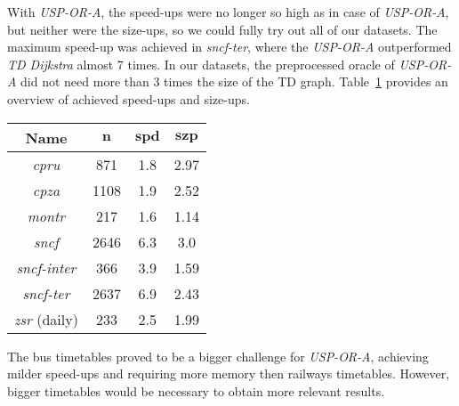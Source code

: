 		\noindent With \textit{USP-OR-A}, the speed-ups were no longer so high as in case of \textit{USP-OR-A}, but neither were the size-ups, so we could fully try out all of our datasets. The maximum speed-up was achieved in \textit{sncf-ter}, where the \textit{USP-OR-A} outperformed \textit{TD Dijkstra} almost 7 times. In our datasets, the preprocessed oracle of \textit{USP-OR-A} did not need more than 3 times the size of the TD graph. Table~\ref{tab:uspora-speedup} provides an overview of achieved speed-ups and size-ups.
	
		\begin{table}[H]
			\centering
			\begin{tabular}{c|c|c|c}
	            \rowcolor{tablehead}
	            \textbf{Name} & $\bm{n}$ & $\bm{spd}$ & $\bm{szp}$ \\
				\hline
				\textit{cpru} & 871 & 1.8 & 2.97 \\
				\textit{cpza} & 1108 & 1.9 & 2.52 \\
				\textit{montr} & 217 & 1.6 & 1.14 \\
				\textit{sncf} & 2646 & 6.3 & 3.0 \\
				\textit{sncf-inter} & 366 & 3.9 & 1.59 \\
				\textit{sncf-ter} & 2637 & 6.9 & 2.43 \\
				\textit{zsr} (daily) & 233 & 2.5 & 1.99 \\	
			\end{tabular}
			\label{tab:uspora-speedup}
		\end{table}
	
		\noindent The bus timetables proved to be a bigger challenge for \textit{USP-OR-A}, achieving milder speed-ups and requiring more memory then railways timetables. However, bigger timetables would be necessary to obtain more relevant results.
		
		\begin{figure}[H]
		\centering
		\end{figure}
		
